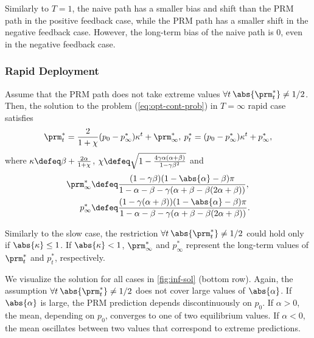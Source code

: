Similarly to $T=1$, the naive path has a smaller bias and shift than the PRM
path in the positive feedback case, while the PRM path has a smaller shift
in the negative feedback case. However, the long-term bias of the naive path is
$0$, even in the negative feedback case.

\subsubsection{Rapid Deployment}
\label{sec:inf-rapid}

\begin{theorem}
    \label{thm:inf-rapid-sol}
    Assume that the PRM path does not take extreme values $\forall
    t \: \abs{\prm^*_t} \neq 1/2$. Then, the solution to the problem
    (\ref{eq:opt-cont-prob}) in $T=\infty$ rapid case satisfies
    \[
        \prm^*_t = \frac{2}{1 + \chi} (p_0 - p^*_\infty) \kappa^t +
        \prm^*_\infty,\:
        p^*_t = (p_0 - p^*_\infty) \kappa^t + p^*_\infty,
    \]
    where $\kappa \defeq \beta + \frac{2 \alpha}{1 + \chi}$, $\chi \defeq \sqrt{1 - \frac{4 \gamma \alpha (\alpha + \beta)}{1 -
            \gamma \beta^2}}$ and
    \[
        \begin{split}
            \prm^*_\infty & \defeq \frac{(1 - \gamma \beta) (1 - \abs{\alpha} -
            \beta) \pi}{1 - \alpha - \beta - \gamma (\alpha + \beta -
            \beta (2 \alpha + \beta))},\\
            p^*_\infty & \defeq \frac{(1 - \gamma (\alpha + \beta)) (1 -
            \abs{\alpha} - \beta) \pi}{1 - \alpha - \beta - \gamma
            (\alpha + \beta - \beta (2 \alpha + \beta))}.
        \end{split}
    \]
\end{theorem}

Similarly to the slow case, the restriction $\forall t \: \abs{\prm^*_t} \neq
1/2$ could hold only if $\abs{\kappa} \le 1$. If $\abs{\kappa} < 1$,
$\prm^*_\infty$ and $p^*_\infty$ represent the long-term values of $\prm^*_t$
and $p^*_t$, respectively.

We visualize the solution for all cases in \cref{fig:inf-sol} (bottom row).
Again, the assumption $\forall t \: \abs{\prm^*_t} \neq 1/2$ does not cover
large values of $\abs{\alpha}$. If $\abs{\alpha}$ is large, the PRM
prediction depends discontinuously on $p_0$. If $\alpha > 0$, the mean,
depending on $p_0$, converges to one of two equilibrium values. If $\alpha <
0$, the mean oscillates between two values that correspond to extreme
predictions.

